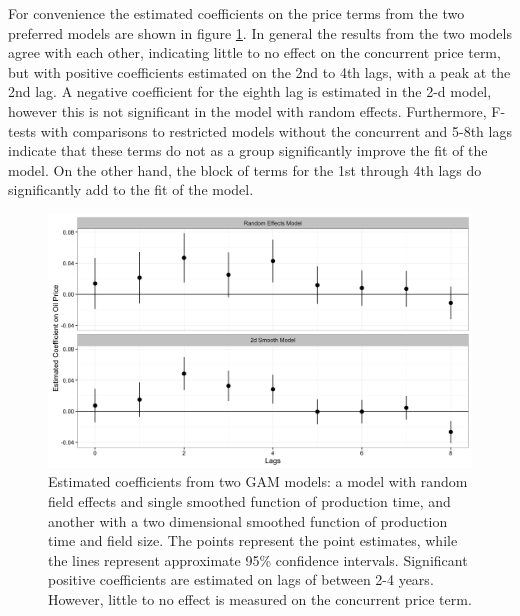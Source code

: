 \documentclass[12pt]{article}
\begin{document}
 
For convenience the estimated coefficients on the price terms from the two preferred models are shown in figure \ref{price_coefficients}. In general the results from the two models agree with each other, indicating little to no effect on the concurrent price term, but with positive coefficients estimated on the 2nd to 4th lags, with a peak at the 2nd lag. A negative coefficient for the eighth lag is estimated in the 2-d model, however this is not significant in the model with random effects. Furthermore, F-tests with comparisons to restricted models without the concurrent and 5-8th lags indicate that these terms do not as a group significantly improve the fit of the model. On the other hand, the block of terms for the 1st through 4th lags do significantly add to the fit of the model.

\begin{figure}
	\includegraphics[width=1\textwidth]{figures/price_coefficents.png}
	\caption{Estimated coefficients from two GAM models: a model with random field effects and single smoothed function of production time, and another with a two dimensional smoothed function of production time and field size.  The points represent the point estimates, while the lines represent approximate 95\% confidence intervals. Significant positive coefficients are estimated on lags of between 2-4 years.  However, little to no effect is measured on the concurrent price term.}
	\label{price_coefficients}
\end{figure}
\end{document}

